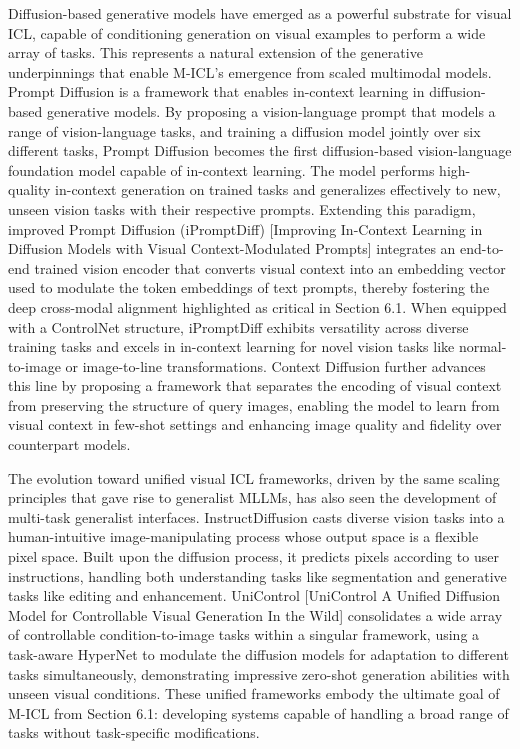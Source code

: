 \documentclass[11pt]{article}
\begin{document}
Diffusion-based generative models have emerged as a powerful substrate for visual ICL, capable of conditioning generation on visual examples to perform a wide array of tasks. This represents a natural extension of the generative underpinnings that enable M-ICL's emergence from scaled multimodal models. Prompt Diffusion \cite{ref231} is a framework that enables in-context learning in diffusion-based generative models. By proposing a vision-language prompt that models a range of vision-language tasks, and training a diffusion model jointly over six different tasks, Prompt Diffusion becomes the first diffusion-based vision-language foundation model capable of in-context learning. The model performs high-quality in-context generation on trained tasks and generalizes effectively to new, unseen vision tasks with their respective prompts. Extending this paradigm, improved Prompt Diffusion (iPromptDiff) {[}Improving In-Context Learning in Diffusion Models with Visual
Context-Modulated Prompts{]} integrates an end-to-end trained vision encoder that converts visual context into an embedding vector used to modulate the token embeddings of text prompts, thereby fostering the deep cross-modal alignment highlighted as critical in Section 6.1. When equipped with a ControlNet structure, iPromptDiff exhibits versatility across diverse training tasks and excels in in-context learning for novel vision tasks like normal-to-image or image-to-line transformations. Context Diffusion \cite{ref232} further advances this line by proposing a framework that separates the encoding of visual context from preserving the structure of query images, enabling the model to learn from visual context in few-shot settings and enhancing image quality and fidelity over counterpart models.

The evolution toward unified visual ICL frameworks, driven by the same scaling principles that gave rise to generalist MLLMs, has also seen the development of multi-task generalist interfaces. InstructDiffusion \cite{ref233} casts diverse vision tasks into a human-intuitive image-manipulating process whose output space is a flexible pixel space. Built upon the diffusion process, it predicts pixels according to user instructions, handling both understanding tasks like segmentation and generative tasks like editing and enhancement. UniControl {[}UniControl A Unified Diffusion Model for Controllable Visual Generation
In the Wild{]} consolidates a wide array of controllable condition-to-image tasks within a singular framework, using a task-aware HyperNet to modulate the diffusion models for adaptation to different tasks simultaneously, demonstrating impressive zero-shot generation abilities with unseen visual conditions. These unified frameworks embody the ultimate goal of M-ICL from Section 6.1: developing systems capable of handling a broad range of tasks without task-specific modifications.
\end{document}
